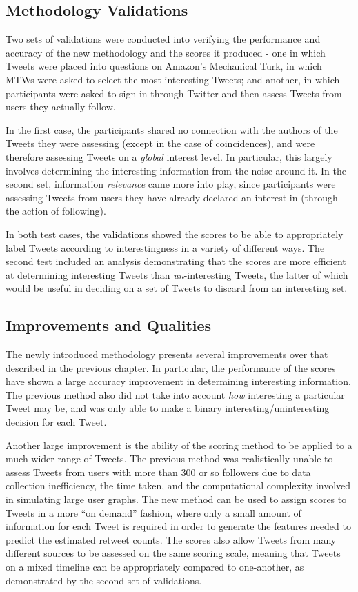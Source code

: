 \subsection{Methodology Validations}
Two sets of validations were conducted into verifying the performance and accuracy of the new methodology and the scores it produced - one in which Tweets were placed into questions on Amazon's Mechanical Turk, in which MTWs were asked to select the most interesting Tweets; and another, in which participants were asked to sign-in through Twitter and then assess Tweets from users they actually follow.

In the first case, the participants shared no connection with the authors of the Tweets they were assessing (except in the case of coincidences), and were therefore assessing Tweets on a \textit{global} interest level. In particular, this largely involves determining the interesting information from the noise around it. In the second set, information \textit{relevance} came more into play, since participants were assessing Tweets from users they have already declared an interest in (through the action of following).

In both test cases, the validations showed the scores to be able to appropriately label Tweets according to interestingness in a variety of different ways. The second test included an analysis demonstrating that the scores are more efficient at determining interesting Tweets than \textit{un}-interesting Tweets, the latter of which would be useful in deciding on a set of Tweets to discard from an interesting set. 

\subsection{Improvements and Qualities}
The newly introduced methodology presents several improvements over that described in the previous chapter. In particular, the performance of the scores have shown a large accuracy improvement in determining interesting information. The previous method also did not take into account \textit{how} interesting a particular Tweet may be, and was only able to make a binary interesting/uninteresting decision for each Tweet.

Another large improvement is the ability of the scoring method to be applied to a much wider range of Tweets. The previous method was realistically unable to assess Tweets from users with more than 300 or so followers due to data collection inefficiency, the time taken, and the computational complexity involved in simulating large user graphs. The new method can be used to assign scores to Tweets in a more ``on demand'' fashion, where only a small amount of information for each Tweet is required in order to generate the features needed to predict the estimated retweet counts. The scores also allow Tweets from many different sources to be assessed on the same scoring scale, meaning that Tweets on a mixed timeline can be appropriately compared to one-another, as demonstrated by the second set of validations.
